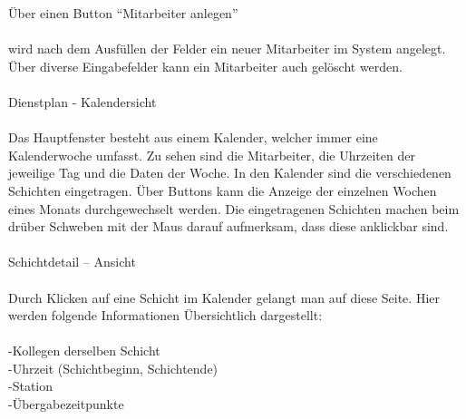 \documentclass[11pt,
paper=a4,
bibtotocnumbered,	  %
liststotocnumbered,  %
DIV=calc,		  %
tablecaptionabove,	  %
headinclude,
]{article}
\begin{document}
Über einen Button “Mitarbeiter anlegen” \\\\ wird nach dem Ausfüllen der Felder ein neuer Mitarbeiter im System angelegt. Über diverse Eingabefelder kann ein Mitarbeiter auch gelöscht werden.\\\\
Dienstplan - Kalendersicht\\\\
Das Hauptfenster besteht aus einem Kalender, welcher immer eine Kalenderwoche umfasst. Zu sehen sind die Mitarbeiter, die Uhrzeiten der jeweilige Tag und die Daten der Woche. In den Kalender sind die verschiedenen Schichten eingetragen. Über Buttons kann die Anzeige der einzelnen Wochen eines Monats durchgewechselt werden. Die eingetragenen Schichten machen beim drüber Schweben mit der Maus darauf aufmerksam, dass diese anklickbar sind.\\\\
Schichtdetail – Ansicht\\\\
Durch Klicken auf eine Schicht im Kalender gelangt man auf diese Seite. Hier werden folgende Informationen Übersichtlich dargestellt:\\\\
-Kollegen derselben Schicht \\
-Uhrzeit (Schichtbeginn, Schichtende)\\
-Station\\
-Übergabezeitpunkte\\
\end{document}
